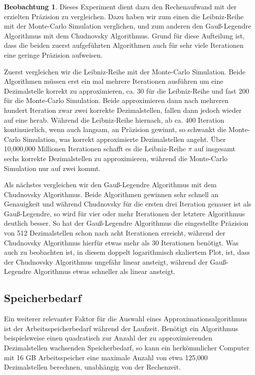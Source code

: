 \documentclass{scrartcl}
\theoremstyle{definition}
\newtheorem{approximation sequence}{Annäherungsfolge}
\newtheorem{observation}{Beobachtung}
\begin{document}
\begin{observation}
    Dieses Experiment dient dazu den Rechenaufwand mit der erzielten Präzision
    zu vergleichen. Dazu haben wir zum einen die Leibniz-Reihe mit der
    Monte-Carlo Simulation verglichen, und zum anderen den Gauß-Legendre
    Algorithmus mit dem Chudnovsky Algorithmus. Grund für diese Aufteilung ist,
    dass die beiden zuerst aufgeführten Algorithmen auch für sehr viele
    Iterationen eine geringe Präzision aufweisen.

    Zuerst vergleichen wir die Leibniz-Reihe mit der Monte-Carlo Simulation.
    Beide Algorithmen müssen erst ein mal mehrere Iterationen ausführen um eine
    Dezimalstelle korrekt zu approximieren, ca. 30 für die Leibniz-Reihe und
    fast 200 für die Monte-Carlo Simulation. Beide approximieren dann nach
    mehreren hundert Iteration zwar zwei korrekte Dezimalstellen, fallen dann
    jedoch wieder auf eine herab. Während die Leibniz-Reihe hiernach, ab ca.
    400 Iteration kontinuierlich, wenn auch langsam, an Präzision gewinnt, so
    schwankt die Monte-Carlo Simulation, was korrekt approximierte
    Dezimalstellen angeht. Über 10,000,000 Millionen Iterationen schafft es die
    Leibniz-Reihe \(\pi\) auf insgesamt sechs korrekte Dezimalstellen zu
    approximieren, während die Monte-Carlo Simulation nur auf zwei kommt.

    Als nächstes vergleichen wir den Gauß-Legendre Algorithmus mit dem
    Chudnovsky Algorithmus. Beide Algorithmen gewinnen sehr schnell an
    Genauigkeit und während Chudnovsky für die ersten drei Iteration genauer
    ist als Gauß-Legendre, so wird für vier oder mehr Iterationen der letztere
    Algorithmus deutlich besser. So hat der Gauß-Legendre Algorithmus die
    eingestellte Präzision von 512 Dezimalstellen schon nach acht Iterationen
    erreicht, während der Chudnovsky Algorithmus hierfür etwas mehr als 30
    Iterationen benötigt. Was auch zu beobachten ist, in diesem doppelt
    logarithmisch skaliertem Plot, ist, dass der Chudnovsky Algorithmus
    ungefähr linear ansteigt, während der Gauß-Legendre Algorithmus etwas
    schneller als linear ansteigt.
\end{observation}

\pagebreak

\subsection{Speicherbedarf}

Ein weiterer relevanter Faktor für die Auswahl eines Approximationsalgorithmus
ist der Arbeitsspeicherbedarf während der Laufzeit. Benötigt ein Algorithmus
beispielsweise einen quadratisch zur Anzahl der zu approximierenden
Dezimalstellen wachsenden Speicherbedarf, so kann ein herkömmlicher Computer
mit 16 GB Arbeitsspeicher eine maximale Anzahl von etwa 125,000 Dezimalstellen
berechnen, unabhängig von der Rechenzeit.
\end{document}
